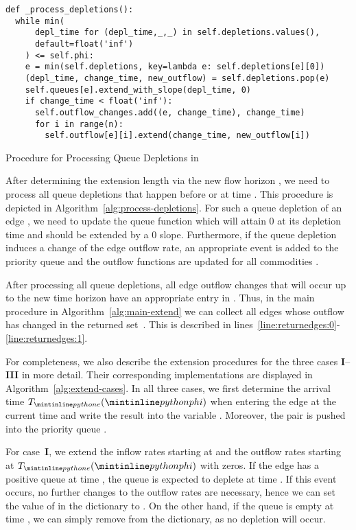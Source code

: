 \begin{algorithm}
    \begin{verbatim}
def _process_depletions():
  while min(
      depl_time for (depl_time,_,_) in self.depletions.values(),
      default=float('inf')
    ) <= self.phi:
    e = min(self.depletions, key=lambda e: self.depletions[e][0])
    (depl_time, change_time, new_outflow) = self.depletions.pop(e)
    self.queues[e].extend_with_slope(depl_time, 0)
    if change_time < float('inf'):
      self.outflow_changes.add((e, change_time), change_time)
      for i in range(n):
        self.outflow[e][i].extend(change_time, new_outflow[i])
\end{verbatim}
\caption{Procedure for Processing Queue Depletions in }
\label{alg:process-depletions}
\end{algorithm}

After determining the extension length via the new flow horizon , we need to process all queue depletions that happen before or at time .
This procedure is depicted in Algorithm~\ref{alg:process-depletions}.
For such a queue depletion of an edge , we need to update the queue function  which will attain $0$ at its depletion time and should be extended by a $0$ slope.
Furthermore, if the queue depletion induces a change of the edge outflow rate, an appropriate event is added to the priority queue  and the outflow functions  are updated for all commodities .

After processing all queue depletions, all edge outflow changes that will occur up to the new time horizon  have an appropriate entry in .
Thus, in the main procedure in Algorithm~\ref{alg:main-extend} we can collect all edges whose outflow has changed in the returned set~.
This is described in lines~\ref{line:returnedges:0}-\ref{line:returnedges:1}.

For completeness, we also describe the extension procedures for the three cases \textbf{I}--\textbf{III} in more detail.
Their corresponding implementations are displayed in Algorithm~\ref{alg:extend-cases}.
In all three cases, we first determine the arrival time $T_{\code{e}}(\code{phi})$ when entering the edge at the current time  and write the result into the variable .
Moreover, the pair  is pushed into the priority queue .

For case~\textbf{I}, we extend the inflow rates starting at  and the outflow rates starting at $T_{\code{e}}(\code{phi})$ with zeros.
If the edge has a positive queue at time , the queue is expected to deplete at time .
If this event occurs, no further changes to the outflow rates are necessary, hence we can set the value of  in the dictionary  to .
On the other hand, if the queue is empty at time , we can simply remove  from the dictionary, as no depletion will occur.


